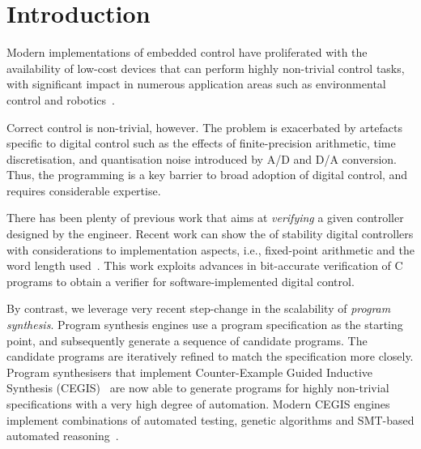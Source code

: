 \documentclass{sig-alternate-05-2015}
\begin{document}
%
%
\printccsdesc



\section{Introduction}

Modern implementations of embedded control have proliferated with the
availability of low-cost devices that can perform highly non-trivial control
tasks, with significant impact in numerous application areas such as
environmental control and robotics~\cite{astrom1997computer, Franklin15}.

Correct control is non-trivial, however. The problem is exacerbated by
artefacts specific to digital control such as the effects of
finite-precision arithmetic, time discretisation, and quantisation noise
introduced by A/D and D/A conversion.  Thus, the programming is a key
barrier to broad adoption of digital control, and requires considerable
expertise.

There has been plenty of previous work that aims at \emph{verifying} a given
controller designed by the engineer.  Recent work can show the of stability
digital controllers with considerations to implementation aspects, i.e.,
fixed-point arithmetic and the word length used~\cite{Bessa16}.  This work
exploits advances in bit-accurate verification of C programs to obtain a
verifier for software-implemented digital control.

By contrast, we leverage very recent step-change in the scalability of
\emph{program synthesis}.  Program synthesis engines use a program
specification as the starting point, and subsequently generate a sequence of
candidate programs.  The candidate programs are iteratively refined to match
the specification more closely.  Program synthesisers that implement
Counter-Example Guided Inductive Synthesis (CEGIS)~\cite{sketch} are now
able to generate programs for highly non-trivial specifications with a very
high degree of automation.  Modern CEGIS engines implement combinations of
automated testing, genetic algorithms and SMT-based automated
reasoning~\cite{DBLP:conf/lpar/DavidKL15, DBLP:conf/cav/0001A14}.
\end{document}
